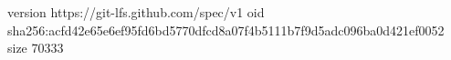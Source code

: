 version https://git-lfs.github.com/spec/v1
oid sha256:acfd42e65e6ef95fd6bd5770dfcd8a07f4b5111b7f9d5adc096ba0d421ef0052
size 70333

